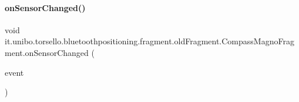 \hypertarget{classit_1_1unibo_1_1torsello_1_1bluetoothpositioning_1_1fragment_1_1oldFragment_1_1CompassMagnoFragment_aa18c6b8e8b0e10f5a37032660755a0fa_aa18c6b8e8b0e10f5a37032660755a0fa}{}\label{classit_1_1unibo_1_1torsello_1_1bluetoothpositioning_1_1fragment_1_1oldFragment_1_1CompassMagnoFragment_aa18c6b8e8b0e10f5a37032660755a0fa_aa18c6b8e8b0e10f5a37032660755a0fa} 
\paragraph{\texorpdfstring{on\+Sensor\+Changed()}{onSensorChanged()}}
{\footnotesize\ttfamily void it.\+unibo.\+torsello.\+bluetoothpositioning.\+fragment.\+old\+Fragment.\+Compass\+Magno\+Fragment.\+on\+Sensor\+Changed (\begin{DoxyParamCaption}\item[{Sensor\+Event}]{event }\end{DoxyParamCaption})}



